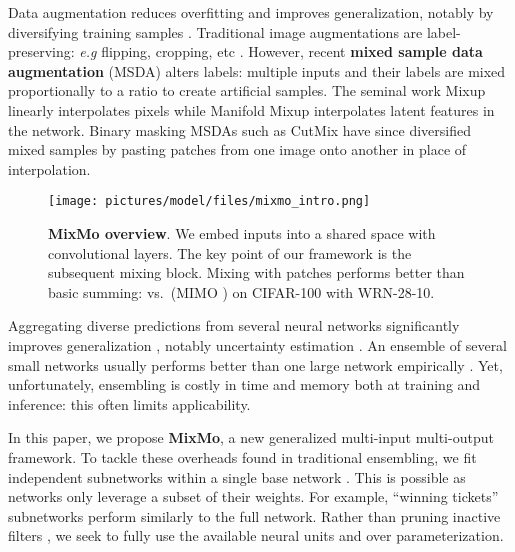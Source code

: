 \documentclass[10pt,twocolumn,letterpaper]{article}
\begin{document}
Data augmentation reduces overfitting and improves generalization, notably by
diversifying training samples \cite{gontijo2020affinity}. Traditional image
augmentations are label-preserving: \textit{e.g} flipping, cropping, etc
\cite{simard1993efficient}. However, recent \textbf{mixed sample data
augmentation} (MSDA) alters labels: multiple inputs and their labels are mixed
proportionally to a ratio  to create artificial samples. The seminal
work Mixup \cite{zhang2018mixup} linearly interpolates pixels while Manifold
Mixup \cite{manifoldmixup19} interpolates latent features in the network.
Binary masking MSDAs \cite{french2020milking,harris2020mix,kim2020puzzle} such as
CutMix \cite{yun2019cutmix} have since diversified mixed samples by pasting patches from one image onto another in place of interpolation.
\begin{figure}\centering \texttt{[image: pictures/model/files/mixmo\_intro.png]}\caption{\textbf{MixMo overview}. We embed  inputs into a shared space with convolutional layers. The key point of our framework is the subsequent mixing block. Mixing with patches performs better than basic summing:  vs.\  (MIMO \cite{havasi2020raining}) on CIFAR-100 with WRN-28-10.}\label{fig:intro}\end{figure}%

Aggregating diverse predictions from several neural networks significantly improves
generalization
\cite{dietterich2000ensemble,hansen1990neural,lakshminarayanan2016simple,wolpert1992stacked},
notably uncertainty estimation
\cite{ashukha2020pitfalls,gustafsson2020evaluating,ovadia2019can}.
An ensemble of several small networks usually performs
better than one large network empirically \cite{chirkova2020deep,lobacheva2020power}.
Yet, unfortunately, ensembling is costly in time and memory both at training and inference: this often limits applicability.

In this paper, we propose \textbf{MixMo}, a new generalized multi-input multi-output
framework. To tackle these overheads found in traditional ensembling, we fit  independent
subnetworks within a single base network
\cite{gao2019ntraensemble,havasi2020raining,soflaei2020aggregated}. This is
possible as networks only leverage a subset of their weights. For example,
``winning tickets'' \cite{lottery2019} subnetworks perform similarly to the full
network. Rather than pruning inactive filters
\cite{e9ee2143e19d49cf9cbe8861950b6b2a,li2017pruning,malach2020proving}, we seek
to fully use the available neural units and over parameterization.
\end{document}
